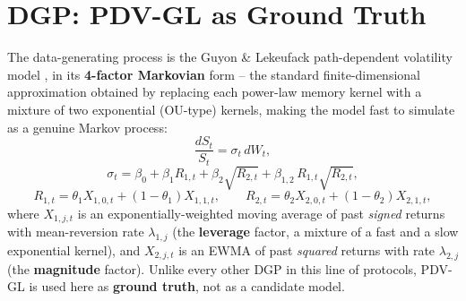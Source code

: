 \documentclass[11pt,a4paper]{article}
\begin{document}
\begin{abstract}
\begin{enumerate}
    \item \textbf{Model evaluation.} Assess the ability of the calibrated
    models to reproduce the Zumbach time-reversal asymmetry of the DGP
    using
    \begin{itemize}
        \item the lag-dependent Zumbach curve $Z(L)$;
        \item the aggregate statistic
        \[
        Z=\frac{1}{3}\left[Z(5)+Z(10)+Z(20)\right];
        \]
        \item complementary diagnostics, including the leverage
        autocorrelation function, volatility autocorrelation function,
        and return-tail statistics.
    \end{itemize}
\end{enumerate}
\end{abstract}

\tableofcontents\vspace{0.4cm}

\section{DGP: PDV-GL as Ground Truth}

The data-generating process is the Guyon \& Lekeufack path-dependent
volatility model \cite{guyon2023}, in its \textbf{4-factor Markovian}
form -- the standard finite-dimensional approximation obtained by
replacing each power-law memory kernel with a mixture of two
exponential (OU-type) kernels, making the model fast to simulate as a
genuine Markov process:
\begin{equation}
  \frac{dS_t}{S_t} = \sigma_t\,dW_t,
  \label{eq:pdvgl_ret}
\end{equation}
\begin{equation}
  \sigma_t = \beta_0 + \beta_1 R_{1,t} + \beta_2\sqrt{R_{2,t}} + \beta_{1,2}\,R_{1,t}\sqrt{R_{2,t}},
  \label{eq:pdvgl_var}
\end{equation}
\begin{equation}
  R_{1,t} = \theta_1 X_{1,0,t} + (1-\theta_1) X_{1,1,t},
  \qquad
  R_{2,t} = \theta_2 X_{2,0,t} + (1-\theta_2) X_{2,1,t},
  \label{eq:pdvgl_factors}
\end{equation}
where $X_{1,j,t}$ is an exponentially-weighted moving average of past
\emph{signed} returns with mean-reversion rate $\lambda_{1,j}$ (the
\textbf{leverage} factor, a mixture of a fast and a slow exponential
kernel), and $X_{2,j,t}$ is an EWMA of past \emph{squared} returns with
rate $\lambda_{2,j}$ (the \textbf{magnitude} factor). Unlike every
other DGP in this line of protocols, PDV-GL is used here as
\textbf{ground truth}, not as a candidate model.
\end{document}
